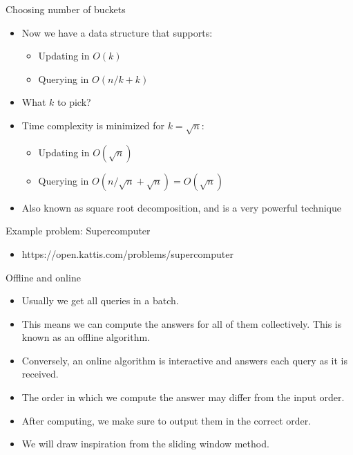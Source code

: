 \documentclass{beamer}
\begin{document}
\begin{frame}[plain]{Choosing number of buckets}
    \begin{itemize}
        \item<1-> Now we have a data structure that supports:
            \begin{itemize}
                \item<2-> Updating in $O(k)$
                \item Querying in $O(n/k + k)$
            \end{itemize}
        \item<3-> What $k$ to pick?
        \item<4-> Time complexity is minimized for $k=\sqrt{n}$:
            \begin{itemize}
                \item<5-> Updating in $O(\sqrt{n})$
                \item<6-> Querying in $O(n/\sqrt{n} + \sqrt{n}) = O(\sqrt{n})$
            \end{itemize}
        \item<7-> Also known as square root decomposition, and is a very
            powerful technique
    \end{itemize}
\end{frame}

\begin{frame}[plain]{Example problem: Supercomputer}
    \begin{itemize}
        \item https://open.kattis.com/problems/supercomputer
    \end{itemize}
\end{frame}

\begin{frame}[plain]{Offline and online}
    \begin{itemize}
        \item Usually we get all queries in a batch.
        \item This means we can compute the answers for all of them collectively. This is known as an offline algorithm.
        \item Conversely, an online algorithm is interactive and answers each query as it is received.
        \item The order in which we compute the answer may differ from the input order.
        \item After computing, we make sure to output them in the correct order.
        \item We will draw inspiration from the sliding window method.
    \end{itemize}
\end{frame}
\end{document}
